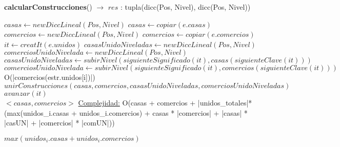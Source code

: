 \begin{Algoritmos}
\begin{algorithm}[H]{\textbf{calcularConstrucciones}() $\to$ $res$ : tupla(dicc(Pos, Nivel), dicc(Pos, Nivel))} %
\begin{algorithmic}[1]
    \State {}
    \State $casas \gets new DiccLineal(Pos, Nivel)$ 
    \State $casas \gets copiar(e.casas)$ 
    \State $comercios \gets new DiccLineal(Pos, Nivel)$ 
    \State $comercios \gets copiar(e.comercios)$ 
    \State $it \gets creatIt(e.unidos)$ 
     
        \State {}
        \State $casasUnidoNiveladas \gets new DiccLineal(Pos, Nivel)$ 
        \State $comerciosUnidoNivelada \gets new DiccLineal(Pos, Nivel)$ 
        \State $casasUnidoNiveladas \gets subirNivel(siguienteSignificado(it), casas(siguienteClave(it)))$ 
        \State $comerciosUnidoNivelada \gets subirNivel(siguienteSignificado(it), comercios(siguienteClave(it)))$ {O(|comercios(estr.unidos[i])|)}
        \State $unirConstrucciones(casas, comercios, casasUnidoNiveladas, comerciosUnidoNiveladas)$ 
        \State $avanzar(it)$ 
    \EndWhile \\
    \Return $<casas, comercios>$
    \medskip
    \Statex \underline{Complejidad:} O(casas + comercios + |unidos\_totales|*(max(unidos_i.casas + unidos_i.comercios) + casas * |comercios| + |casas| * |casUN| + |comercios| * |comUN|))
    
    \Statex {}
    \Statex {} $max(unidos_i.casas + unidos_i.comercios)$ 

    \Statex {}
	\Statex \tab{}

	\Statex \tab{}
	\Statex \tab{}
	\Statex \tab{}
	\Statex \tab{}


\end{algorithmic}
\end{algorithm}
\end{Algoritmos}
